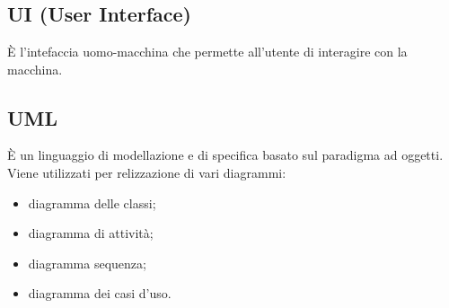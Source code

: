 \section{}
\subsection*{UI (User Interface)} È l'intefaccia uomo-macchina che permette all'utente di interagire con la macchina.
\subsection*{UML} È un linguaggio di modellazione e di specifica basato sul paradigma ad oggetti. Viene utilizzati per relizzazione di vari diagrammi:
\begin{itemize}
    \item diagramma delle classi;
    \item diagramma di attività;
    \item diagramma sequenza;
    \item diagramma dei casi d'uso.
\end{itemize}